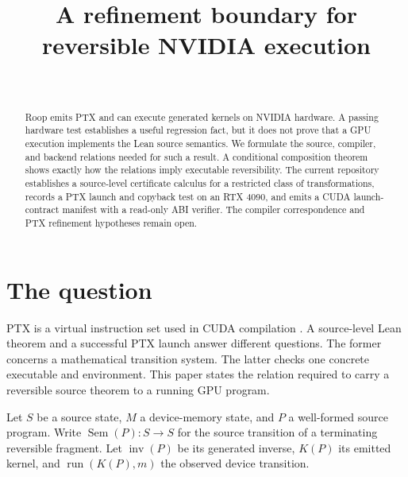 \documentclass[aop,preprint]{../aop-template/imsart}
\theoremstyle{definition}
\newcommand{\Sem}[1]{\operatorname{Sem}(#1)}
\begin{document}
\begin{frontmatter}
\title{A refinement boundary for reversible NVIDIA execution}

\begin{aug}
\author{~}
\end{aug}

\begin{abstract}
Roop emits PTX and can execute generated kernels on NVIDIA hardware. A passing hardware test establishes a useful regression fact, but it does not prove that a GPU execution implements the Lean source semantics. We formulate the source, compiler, and backend relations needed for such a result. A conditional composition theorem shows exactly how the relations imply executable reversibility. The current repository establishes a source-level certificate calculus for a restricted class of transformations, records a PTX launch and copyback test on an RTX 4090, and emits a CUDA launch-contract manifest with a read-only ABI verifier. The compiler correspondence and PTX refinement hypotheses remain open.
\end{abstract}

\begin{keyword}[class=MSC]
\end{keyword}

\begin{keyword}
\end{keyword}

\end{frontmatter}

\section{The question}

PTX is a virtual instruction set used in CUDA compilation \cite{nvidia2025cuda}. A source-level Lean theorem and a successful PTX launch answer different questions. The former concerns a mathematical transition system. The latter checks one concrete executable and environment. This paper states the relation required to carry a reversible source theorem to a running GPU program.

Let $S$ be a source state, $M$ a device-memory state, and $P$ a well-formed source program. Write $\Sem{P}:S\to S$ for the source transition of a terminating reversible fragment. Let $\operatorname{inv}(P)$ be its generated inverse, $K(P)$ its emitted kernel, and $\operatorname{run}(K(P),m)$ the observed device transition.
\end{document}

